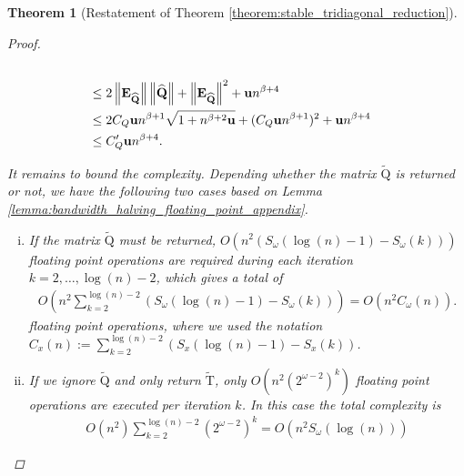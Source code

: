 \documentclass{article}
\newcommand{\lnorm}{\left\|}
\newcommand{\rnorm}{\right\|}
\newcommand{\lpar}{\left(}
\newcommand{\rpar}{\right)}
\newtheorem{theorem}{Theorem}[section]
\newcommand\matE{\boldsymbol{\mathrm{E}}}
\newcommand\matQtilde{\widetilde{\boldsymbol{\mathrm{Q}}}}
\newcommand\matTtilde{\widetilde{\boldsymbol{\mathrm{T}}}}
\newcommand\matQhat{\widehat{\boldsymbol{\mathrm{Q}}}}
\newcommand{\umach}{\textbf{\textup{u}}}
\newcommand{\cmm}{\beta}
\begin{document}
\begin{theorem}[Restatement of Theorem \ref{theorem:stable_tridiagonal_reduction}]
\begin{proof}
\begin{align*}
            \\
            &\leq
            2\lnorm \matE_{\matQhat}\rnorm \lnorm \matQhat\rnorm
            +
            \lnorm \matE_{\matQhat} \rnorm^2
            +
            \umach n^{\cmm+4}
            \\
            &\leq
            2C_Q\umach n^{\cmm+1}\sqrt{1+n^{\cmm+2}\umach}
            +
            (C_Q\umach n^{\cmm+1})^2
            +
            \umach n^{\cmm+4}
            \\
            &\leq
            C_Q'\umach n^{\cmm+4}.
        \end{align*}

        It remains to bound the complexity. 
        Depending whether the matrix $\matQtilde$ is returned or not, we have the following two cases based on Lemma \ref{lemma:bandwidth_halving_floating_point_appendix}.
        \begin{enumerate}[(i)]
            \item If the matrix $\matQtilde$ must be returned, 
            $O\lpar
                n^{2}\lpar 
                    S_{\omega}(\log(n)-1) - S_{\omega}(k)
                \rpar
            \rpar
            $ floating point operations are required during each iteration $k=2,\ldots,\log(n)-2$, which gives a total of 
            \begin{align*}
                O\lpar
                    n^2 
                    \sum_{k=2}^{\log(n)-2}
                    \lpar
                        S_{\omega}(\log(n)-1) - S_{\omega}(k)
                    \rpar
                \rpar
                =
                O\lpar
                    n^2 
                    C_{\omega}(n)
                \rpar
                .
            \end{align*}
            floating point operations, where we used the notation $C_{x}(n) := 
                \sum_{k=2}^{\log(n)-2}
                    \lpar
                        S_{x}(\log(n)-1) - S_{x}(k)
                    \rpar$.
            \item If we ignore $\matQtilde$ and only return $\matTtilde$, only $O(n^{2}(2^{\omega-2})^k)$ floating point operations are executed per iteration $k$. In this case the total complexity is
            \begin{align*}
                O(n^2)\sum_{k=2}^{\log(n)-2} 
                (2^{\omega-2})^k
                =
                O\lpar
                    n^2 S_{\omega}(\log(n))
                \rpar
            \end{align*}

\end{enumerate}
\end{proof}
\end{theorem}
\end{document}
